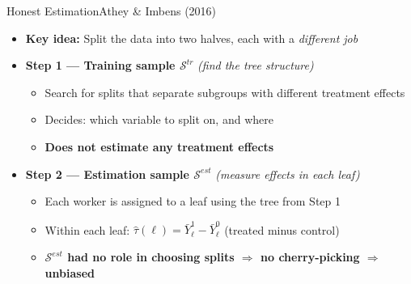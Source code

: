 \documentclass[dvipsnames,hyperref={pdfpagelabels=false}]{beamer}
\begin{document}
\begin{frame}{Honest Estimation}{Athey \& Imbens (2016)}
\begin{itemize}
	\item \textbf{Key idea:} Split the data into two halves, each with a \textit{different job}
	\vspace{0.3cm}
	\item \textbf{Step 1 --- Training sample $\mathcal{S}^{tr}$} \quad \textit{(find the tree structure)}
	\vspace{0.1cm}
	\begin{itemize}
		\item Search for splits that separate subgroups with different treatment effects
		\vspace{0.1cm}
		\item Decides: which variable to split on, and where
		\vspace{0.1cm}
		\item \textbf{Does not estimate any treatment effects}
	\end{itemize}
	\vspace{0.3cm}
	\item \textbf{Step 2 --- Estimation sample $\mathcal{S}^{est}$} \quad \textit{(measure effects in each leaf)}
	\vspace{0.1cm}
	\begin{itemize}
		\item Each worker is assigned to a leaf using the tree from Step 1
		\vspace{0.1cm}
		\item Within each leaf: $\hat{\tau}(\ell) = \bar{Y}^{1}_\ell - \bar{Y}^{0}_\ell$ \quad (treated minus control)
		\vspace{0.1cm}
		\item \textbf{$\mathcal{S}^{est}$ had no role in choosing splits $\Rightarrow$ no cherry-picking $\Rightarrow$ unbiased}
	\end{itemize}
\end{itemize}
\end{frame}
\end{document}
